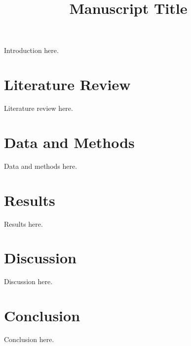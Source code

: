 \documentclass[man,12pt,mask,floatsintext]{apa7}
\title{Manuscript Title}
\begin{document}
\maketitle

Introduction here.

\section{Literature Review}
\label{sec:literature_review}
Literature review here.

\section{Data and Methods}
\label{sec:method}
Data and methods here.

\section{Results}
\label{sec:results}
Results here.

\section{Discussion}
\label{sec:discussion}
Discussion here.

\section{Conclusion}
\label{sec:conclusion}
Conclusion here.

\printbibliography

\end{document}
